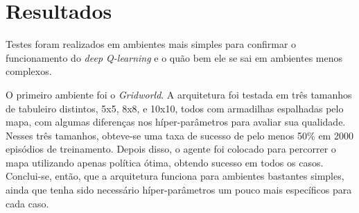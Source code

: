 
\chapter{Resultados}
\label{cap:resultados}

Testes foram realizados em ambientes mais simples para confirmar o funcionamento do \textit{deep Q-learning} e o quão bem ele se sai em ambientes menos complexos.


O primeiro ambiente foi o \textit{Gridworld}.
A arquitetura foi testada em três tamanhos de tabuleiro distintos, 5x5, 8x8, e 10x10, todos com armadilhas espalhadas pelo mapa, com algumas diferenças nos híper-parâmetros para avaliar sua qualidade.
Nesses três tamanhos, obteve-se uma taxa de sucesso de pelo menos 50\% em 2000 episódios de treinamento.
Depois disso, o agente foi colocado para percorrer o mapa utilizando apenas política ótima, obtendo sucesso em todos os casos.
Conclui-se, então, que a arquitetura funciona para ambientes bastantes simples, ainda que tenha sido necessário híper-parâmetros um pouco mais específicos para cada caso.




